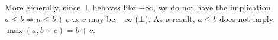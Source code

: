 \documentclass[a4paper,11pt]{article}
\newcommand{\wq}[1]{\textcolor[rgb]{.50,0.0,0.7}{ #1}}
\theoremstyle{definition}
\newtheorem{lem}[thm]{Lemma}
\begin{document}
More generally, since $\bot$ behaves like $-\infty$, we do not have
the implication $a \leq b \Rightarrow a \leq b + c$ as $c$ may be
$-\infty$ ($\bot$). As a result, $a \leq b$ does not imply $\max(a, b
+ c) = b + c$.

%


\end{document}
